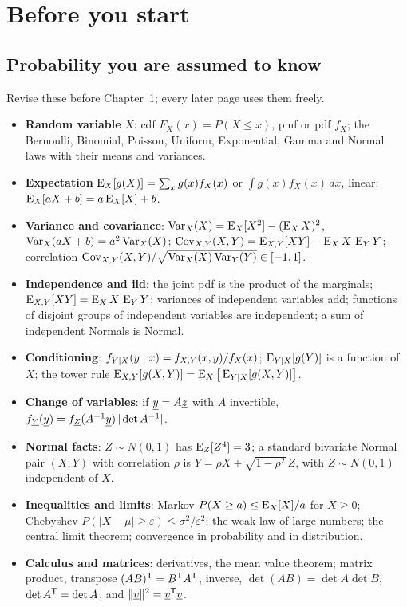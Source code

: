 \chapter{Before you start}

\section*{Probability you are assumed to know}

\begin{setup}
Revise these before Chapter~1; every later page uses them freely.
\begin{itemize}
  \item \textbf{Random variable} $X$: cdf $F_X(x)=P(X\le x)$, pmf or pdf $f_X$; the Bernoulli, Binomial, Poisson, Uniform, Exponential, Gamma and Normal laws with their means and variances.
  \item \textbf{Expectation} $\operatorname{E}_X[g(X)]=\sum_x g(x)f_X(x)$ or $\int g(x)f_X(x)\,dx$, linear: $\operatorname{E}_X[aX+b]=a\operatorname{E}_X[X]+b$.
  \item \textbf{Variance and covariance}: $\operatorname{Var}_X(X)=\operatorname{E}_X[X^2]-(\operatorname{E}_X X)^2$, $\operatorname{Var}_X(aX+b)=a^2\operatorname{Var}_X(X)$; $\operatorname{Cov}_{X,Y}(X,Y)=\operatorname{E}_{X,Y}[XY]-\operatorname{E}_X X\,\operatorname{E}_Y Y$; correlation $\operatorname{Cov}_{X,Y}(X,Y)/\sqrt{\operatorname{Var}_X(X)\operatorname{Var}_Y(Y)}\in[-1,1]$.
  \item \textbf{Independence and iid}: the joint pdf is the product of the marginals; $\operatorname{E}_{X,Y}[XY]=\operatorname{E}_X X\,\operatorname{E}_Y Y$; variances of independent variables add; functions of disjoint groups of independent variables are independent; a sum of independent Normals is Normal.
  \item \textbf{Conditioning}: $f_{Y\mid X}(y\mid x)=f_{X,Y}(x,y)/f_X(x)$; $\operatorname{E}_{Y\mid X}[g(Y)]$ is a function of $X$; the tower rule $\operatorname{E}_{X,Y}[g(X,Y)]=\operatorname{E}_X\big[\operatorname{E}_{Y\mid X}[g(X,Y)]\big]$.
  \item \textbf{Change of variables}: if $\underline{y}=A\underline{z}$ with $A$ invertible, $f_{\underline{Y}}(\underline{y})=f_{\underline{Z}}(A^{-1}\underline{y})\,|\det A^{-1}|$.
  \item \textbf{Normal facts}: $Z\sim N(0,1)$ has $\operatorname{E}_Z[Z^4]=3$; a standard bivariate Normal pair $(X,Y)$ with correlation $\rho$ is $Y=\rho X+\sqrt{1-\rho^2}\,Z$, with $Z\sim N(0,1)$ independent of $X$.
  \item \textbf{Inequalities and limits}: Markov $P(X\ge a)\le\operatorname{E}_X[X]/a$ for $X\ge0$; Chebyshev $P(|X-\mu|\ge\varepsilon)\le\sigma^2/\varepsilon^2$; the weak law of large numbers; the central limit theorem; convergence in probability and in distribution.
  \item \textbf{Calculus and matrices}: derivatives, the mean value theorem; matrix product, transpose $(AB)^{\mathsf{T}}=B^{\mathsf{T}} A^{\mathsf{T}}$, inverse, $\det(AB)=\det A\det B$, $\det A^{\mathsf{T}}=\det A$, and $\|\underline{v}\|^2=\underline{v}^{\mathsf{T}}\underline{v}$.
\end{itemize}
\end{setup}

